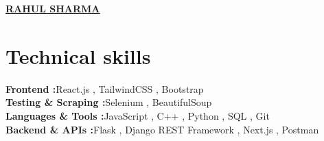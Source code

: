 \documentclass[letterpaper,10pt]{article}
\begin{document}

\begin{center}
  \textbf{\Large \underline{\href{https://rahulwrites.onrender.com}{RAHUL SHARMA}}}
  \\[6pt]
  \small
\end{center}

\section*{Technical skills}
{\small
\noindent
\textbf{Frontend :}\quad React.js , TailwindCSS , Bootstrap  \\
\textbf{Testing \& Scraping :}\quad Selenium , BeautifulSoup\\ 
\textbf{Languages \& Tools :}\quad JavaScript , C++ , Python , SQL , Git\\
\textbf{Backend \& APIs :}\quad Flask , Django REST Framework , Next.js , Postman\\
}

\end{document}
